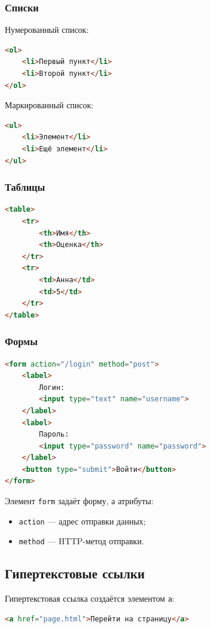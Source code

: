 \documentclass[12pt,a4paper]{article}
\begin{document}
\subsubsection{Списки}

Нумерованный список:
\begin{lstlisting}[language=HTML]
<ol>
    <li>Первый пункт</li>
    <li>Второй пункт</li>
</ol>
\end{lstlisting}

Маркированный список:
\begin{lstlisting}[language=HTML]
<ul>
    <li>Элемент</li>
    <li>Ещё элемент</li>
</ul>
\end{lstlisting}

\subsubsection{Таблицы}

\begin{lstlisting}[language=HTML]
<table>
    <tr>
        <th>Имя</th>
        <th>Оценка</th>
    </tr>
    <tr>
        <td>Анна</td>
        <td>5</td>
    </tr>
</table>
\end{lstlisting}

\subsubsection{Формы}

\begin{lstlisting}[language=HTML]
<form action="/login" method="post">
    <label>
        Логин:
        <input type="text" name="username">
    </label>
    <label>
        Пароль:
        <input type="password" name="password">
    </label>
    <button type="submit">Войти</button>
</form>
\end{lstlisting}

Элемент \texttt{form} задаёт форму, а атрибуты:
\begin{itemize}
    \item \texttt{action} --- адрес отправки данных;
    \item \texttt{method} --- HTTP-метод отправки.
\end{itemize}

\subsection{Гипертекстовые ссылки}

Гипертекстовая ссылка создаётся элементом \texttt{a}:
\begin{lstlisting}[language=HTML]
<a href="page.html">Перейти на страницу</a>
\end{lstlisting}
\end{document}
